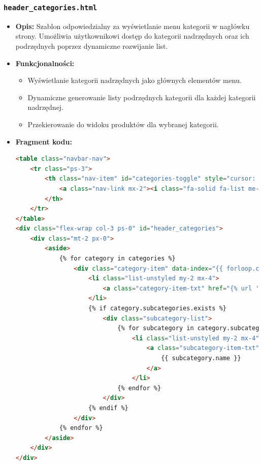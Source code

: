\documentclass[12pt,a4paper,oneside]{article}
\theoremstyle{definition}
\numberwithin{equation}{section}
\begin{document}
\subsubsection*{\texttt{header\_categories.html}}
\begin{itemize}
    \item \textbf{Opis:}
    Szablon odpowiedzialny za wyświetlanie menu kategorii w nagłówku strony. Umożliwia użytkownikowi dostęp do kategorii nadrzędnych oraz ich podrzędnych poprzez dynamiczne rozwijanie list.
    \item \textbf{Funkcjonalności:}
    \begin{itemize}
        \item Wyświetlanie kategorii nadrzędnych jako głównych elementów menu.
        \item Dynamiczne generowanie listy podrzędnych kategorii dla każdej kategorii nadrzędnej.
        \item Przekierowanie do widoku produktów dla wybranej kategorii.
    \end{itemize}
    \item \textbf{Fragment kodu:}
    \begin{lstlisting}[language=HTML, caption=Szablon \texttt{header\_categories.html}]
<table class="navbar-nav">
    <tr class="ps-3">
        <th class="nav-item" id="categories-toggle" style="cursor: pointer" aria-expanded="false" title="Categories">
            <a class="nav-link mx-2"><i class="fa-solid fa-list me-2"></i>Kategorie</a>
        </th>
    </tr>
</table>
<div class="flex-wrap col-3 ps-0" id="header_categories">
    <div class="mt-2 px-0">
        <aside>
            {% for category in categories %}
                <div class="category-item" data-index="{{ forloop.counter0 }}">
                    <li class="list-unstyled my-2 mx-4">
                        <a class="category-item-txt" href="{% url 'category_products' category.id %}">{{ category.name }}</a>
                    </li>
                    {% if category.subcategories.exists %}
                        <div class="subcategory-list">
                            {% for subcategory in category.subcategories.all %}
                                <li class="list-unstyled my-2 mx-4">
                                    <a class="subcategory-item-txt" href="{% url 'category_products' subcategory.id %}">
                                        {{ subcategory.name }}
                                    </a>
                                </li>
                            {% endfor %}
                        </div>
                    {% endif %}
                </div>
            {% endfor %}
        </aside>
    </div>
</div>
    \end{lstlisting}
\end{itemize}
\end{document}
